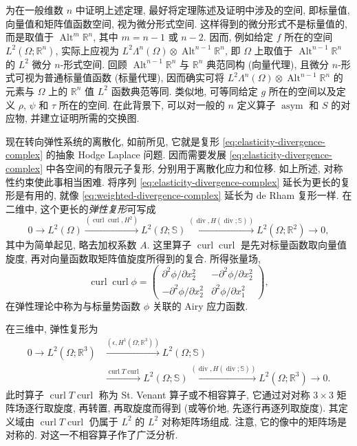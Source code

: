\begin{Remark}\label{rem:elasticity-general-dimension}
为在一般维数 $n$ 中证明上述定理, 最好将定理陈述及证明中涉及的空间, 即标量值, 向量值和矩阵值函数空间, 视为微分形式空间. 这样得到的微分形式不是标量值的, 而是取值于 $\operatorname{Alt}^m\mathbb R^n$, 其中 $m=n-1$ 或 $n-2$. 因而, 例如给定 $f$ 所在的空间 $L^2(\Omega;\mathbb R^n)$, 实际上应视为 $L^2\Lambda^n(\Omega)\otimes\operatorname{Alt}^{n-1}\mathbb R^n$, 即 $\Omega$ 上取值于 $\operatorname{Alt}^{n-1}\mathbb R^n$ 的 $L^2$ 微分 $n$-形式空间. 回顾 $\operatorname{Alt}^{n-1}\mathbb R^n$ 与 $\mathbb R^n$ 典范同构 (向量代理), 且微分 $n$-形式可视为普通标量值函数 (标量代理), 因而确实可将 $L^2\Lambda^n(\Omega)\otimes\operatorname{Alt}^{n-1}\mathbb R^n$ 的元素与 $\Omega$ 上的 $\mathbb R^n$ 值 $L^2$ 函数典范等同. 类似地, 可等同给定 $g$ 所在的空间以及定义 $\rho$, $\psi$ 和 $\tau$ 所在的空间. 在此背景下, 可以对一般的 $n$ 定义算子 $\operatorname{asym}$ 和 $S$ 的对应物, 并建立证明所需的交换图.
\end{Remark}

现在转向弹性系统的离散化, 如前所见, 它就是复形 \eqref{eq:elasticity-divergence-complex} 的抽象 Hodge Laplace 问题. 因而需要发展 \eqref{eq:elasticity-divergence-complex} 中各空间的有限元子复形, 分别用于离散化应力和位移. 如上所述, 对称性约束使此事相当困难. 将序列 \eqref{eq:elasticity-divergence-complex} 延长为更长的复形是有用的, 就像 \eqref{eq:weighted-divergence-complex} 延长为 de Rham 复形一样. 在二维中, 这个更长的\emph{弹性复形}可写成
\begin{equation}\label{eq:two-dimensional-elasticity-complex}
0\to L^2(\Omega)\xrightarrow{(\operatorname{curl}\operatorname{curl},H^2)}L^2(\Omega;\mathbb S)\xrightarrow{(\operatorname{div},H(\operatorname{div};\mathbb S))}L^2(\Omega;\mathbb R^2)\to0,
\end{equation}
其中为简单起见, 略去加权系数 $A$. 这里算子 $\operatorname{curl}\operatorname{curl}$ 是先对标量函数取向量值旋度, 再对向量函数取矩阵值旋度所得到的复合. 所得张量场,
\[
\operatorname{curl}\operatorname{curl}\phi=
\begin{pmatrix}\partial^2\phi/\partial x_2^2&-\partial^2\phi/\partial x_2^2\\-\partial^2\phi/\partial x_2^2&\partial^2\phi/\partial x_1^2\end{pmatrix},
\]
在弹性理论中称为与标量势函数 $\phi$ 关联的 Airy 应力函数.

在三维中, 弹性复形为
\[
\begin{aligned}
0\to L^2(\Omega;\mathbb R^3)&\xrightarrow{(\epsilon,H^1(\Omega;\mathbb R^3))}L^2(\Omega;\mathbb S)\\
&\xrightarrow{\operatorname{curl}T\operatorname{curl}}L^2(\Omega;\mathbb S)\xrightarrow{(\operatorname{div},H(\operatorname{div};\mathbb S))}L^2(\Omega;\mathbb R^3)\to0.
\end{aligned}
\]
此时算子 $\operatorname{curl}T\operatorname{curl}$ 称为 St. Venant 算子或不相容算子, 它通过对对称 $3\times3$ 矩阵场逐行取旋度, 再转置, 再取旋度而得到 (或等价地, 先逐行再逐列取旋度). 其定义域由 $\operatorname{curl}T\operatorname{curl}$ 仍属于 $L^2$ 的 $L^2$ 对称矩阵场组成. 注意, 它的像中的矩阵场是对称的.  对这一不相容算子作了广泛分析.

